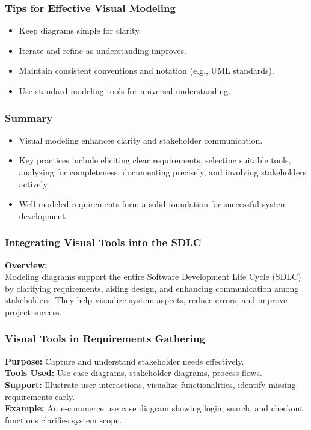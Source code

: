 \documentclass{beamer}
\begin{document}
\begin{frame}[fragile]
    \frametitle{Tips for Effective Visual Modeling}
    \begin{itemize}
        \item Keep diagrams simple for clarity.
        \item Iterate and refine as understanding improves.
        \item Maintain consistent conventions and notation (e.g., UML standards).
        \item Use standard modeling tools for universal understanding.
    \end{itemize}
\end{frame}

\begin{frame}[fragile]
    \frametitle{Summary}
    \begin{itemize}
        \item Visual modeling enhances clarity and stakeholder communication.
        \item Key practices include eliciting clear requirements, selecting suitable tools, analyzing for completeness, documenting precisely, and involving stakeholders actively.
        \item Well-modeled requirements form a solid foundation for successful system development.
    \end{itemize}
\end{frame}

\begin{frame}[fragile]
    \frametitle{Integrating Visual Tools into the SDLC}
    \textbf{Overview:} \\
    Modeling diagrams support the entire Software Development Life Cycle (SDLC) by clarifying requirements, aiding design, and enhancing communication among stakeholders. They help visualize system aspects, reduce errors, and improve project success.
\end{frame}

\begin{frame}[fragile]
    \frametitle{Visual Tools in Requirements Gathering}
    \textbf{Purpose:} Capture and understand stakeholder needs effectively. \\
    \textbf{Tools Used:} Use case diagrams, stakeholder diagrams, process flows. \\
    \textbf{Support:} Illustrate user interactions, visualize functionalities, identify missing requirements early. \\
    \textbf{Example:} An e-commerce use case diagram showing login, search, and checkout functions clarifies system scope.
\end{frame}
\end{document}
